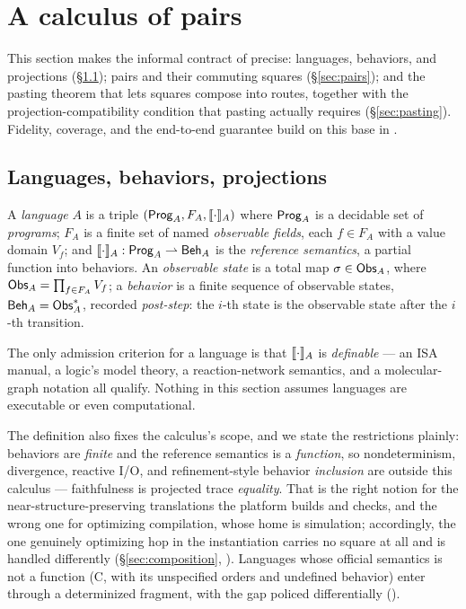 \section{A calculus of pairs}
\label{sec:calculus}

This section makes the informal contract of  precise:
languages, behaviors, and projections (\S\ref{sec:languages}); pairs and
their commuting squares (\S\ref{sec:pairs}); and the pasting theorem that
lets squares compose into routes, together with the projection-compatibility
condition that pasting actually requires (\S\ref{sec:pasting}). Fidelity,
coverage, and the end-to-end guarantee build on this base in
.

\subsection{Languages, behaviors, projections}
\label{sec:languages}

\begin{definition}[Language]
\label{def:language}
A \emph{language} $A$ is a triple $(\mathsf{Prog}_{A}, F_A, \llbracket \cdot \rrbracket_{A})$ where
$\mathsf{Prog}_{A}$ is a decidable set of \emph{programs}; $F_A$ is a finite set of
named \emph{observable fields}, each $f \in F_A$ with a value domain
$V_f$; and $\llbracket \cdot \rrbracket_{A} : \mathsf{Prog}_{A} \rightharpoonup \mathsf{Beh}_{A}$ is the
\emph{reference semantics}, a partial function into behaviors.
An \emph{observable state} is a total map
$\sigma \in \mathsf{Obs}_{A}$, where $\mathsf{Obs}_{A} = \prod_{f \in F_A} V_f$; a
\emph{behavior} is a finite sequence of observable states,
$\mathsf{Beh}_{A} = \mathsf{Obs}_{A}^{*}$, recorded \emph{post-step}: the $i$-th state is
the observable state after the $i$-th transition.
\end{definition}

The only admission criterion for a language is that $\llbracket \cdot \rrbracket_{A}$ is
\emph{definable} --- an ISA manual, a logic's model theory, a reaction-network
semantics, and a molecular-graph notation all qualify. Nothing in this
section assumes languages are executable or even computational.

The definition also fixes the calculus's scope, and we state the
restrictions plainly: behaviors are \emph{finite} and the reference
semantics is a \emph{function}, so nondeterminism, divergence, reactive
I/O, and refinement-style behavior \emph{inclusion} are outside this
calculus --- faithfulness is projected trace \emph{equality}. That is
the right notion for the near-structure-preserving translations the
platform builds and checks, and the wrong one for optimizing
compilation, whose home is simulation; accordingly, the one genuinely
optimizing hop in the instantiation carries no square at all and is
handled differently (\S\ref{sec:composition},
). Languages whose official semantics is not a
function (C, with its unspecified orders and undefined behavior) enter
through a determinized fragment, with the gap policed differentially
().

